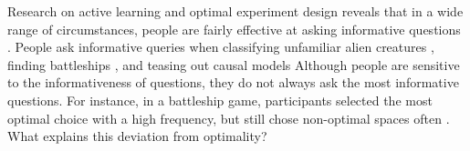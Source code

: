 \documentclass[10pt,letterpaper]{article}
\begin{document}


Research on active learning and optimal experiment design reveals that in a wide range of circumstances, people are fairly effective at asking informative questions \cite{coenen2019asking,NelsonFindingUsefulQuestions2005,GureckisSelfDirectedLearningCognitive2012}.
People ask informative queries when classifying unfamiliar alien creatures \cite{NelsonFindingUsefulQuestions2005}, finding battleships \cite{GureckisActiveLearningStrategies2009}, and teasing out causal models \cite{steyvers2003inferring,cook2011science} %
Although people are sensitive to the informativeness of questions, they do not always ask the most informative questions.  
For instance, in a battleship game, participants selected the most optimal choice with a high frequency, but still chose non-optimal spaces often \cite{GureckisActiveLearningStrategies2009}.
What explains this deviation from optimality? 
\end{document}
